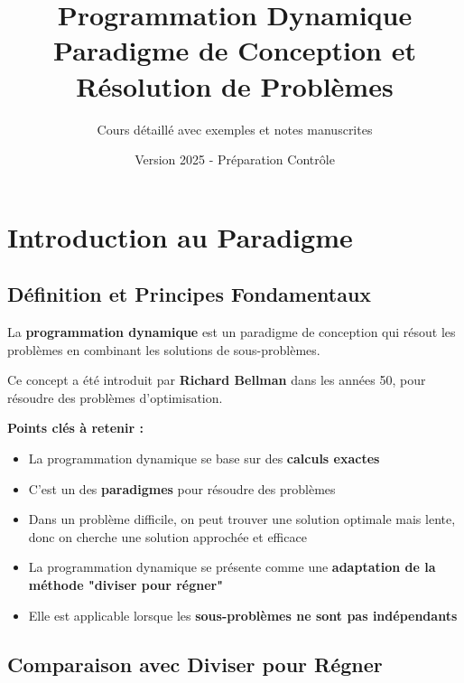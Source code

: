 \documentclass[12pt,a4paper]{article}
\title{\textbf{\Huge\color{titrebleu}Programmation Dynamique}\\[0.5em]
\large\color{defvert}Paradigme de Conception et Résolution de Problèmes}
\author{\large Cours détaillé avec exemples et notes manuscrites}
\date{\large Version 2025 - Préparation Contrôle}
\begin{document}
\maketitle
\tableofcontents
\newpage

\section{Introduction au Paradigme}

\subsection{Définition et Principes Fondamentaux}

\begin{definition}
La \textbf{programmation dynamique} est un paradigme de conception qui résout les problèmes en combinant les solutions de sous-problèmes.

Ce concept a été introduit par \textbf{Richard Bellman} dans les années 50, pour résoudre des problèmes d'optimisation.
\end{definition}

\begin{notecours}
\textbf{Points clés à retenir :}
\begin{itemize}
    \item La programmation dynamique se base sur des \textbf{calculs exactes}
    \item C'est un des \textbf{paradigmes} pour résoudre des problèmes
    \item Dans un problème difficile, on peut trouver une solution optimale mais lente, donc on cherche une solution approchée et efficace
    \item La programmation dynamique se présente comme une \textbf{adaptation de la méthode "diviser pour régner"}
    \item Elle est applicable lorsque les \textbf{sous-problèmes ne sont pas indépendants}
\end{itemize}
\end{notecours}

\subsection{Comparaison avec Diviser pour Régner}
\end{document}
